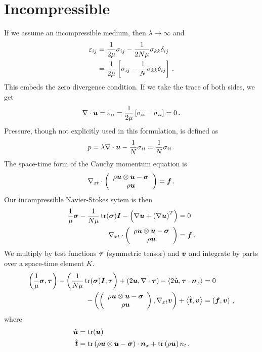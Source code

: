 \documentclass{article}
\begin{document}
\section*{Incompressible}
If we assume an incompressible medium, then $\lambda\rightarrow\infty$ and
\begin{align*}
  \varepsilon_{ij}&=\frac{1}{2\mu}\sigma_{ij}-\frac{1}{2N\mu}\sigma_{kk}\delta_{ij}\\
  &=\frac{1}{2\mu}\left[ \sigma_{ij}-\frac{1}{N}\sigma_{kk}\delta_{ij} \right]\,.
\end{align*}
This embeds the zero divergence condition. If we take the trace of both sides, we get
\begin{align*}
  \nabla\cdot\boldsymbol u=\varepsilon_{ii}=\frac{1}{2\mu}\left[ \sigma_{ii}-\sigma_{ii} \right]=0\,.
\end{align*}
Pressure, though not explicitly used in this formulation, is defined as
\begin{equation*}
p=\lambda\nabla\cdot\boldsymbol u-\frac{1}{N}\sigma_{ii}=\frac{1}{N}\sigma_{ii}\,.
\end{equation*}
The space-time form of the Cauchy momentum equation is
\begin{equation*}
\nabla_{xt}\cdot\left( \begin{array}{c} \rho\boldsymbol u\otimes\boldsymbol u-\boldsymbol\sigma\\ \rho\boldsymbol u\\ \end{array} \right)=\boldsymbol f\,.
\end{equation*}
Our incompressible Navier-Stokes sytem is then
\begin{align*}
\frac{1}{\mu}\boldsymbol\sigma-\frac{1}{N\mu}\operatorname*{tr}(\boldsymbol\sigma)\boldsymbol I-\left( \nabla\boldsymbol u+\left( \nabla\boldsymbol u \right)^T \right)&=0\\
\nabla_{xt}\cdot\left( \begin{array}{c} \rho\boldsymbol u\otimes\boldsymbol u-\boldsymbol\sigma\\ \rho\boldsymbol u\\ \end{array} \right)&=\boldsymbol f\,.
\end{align*}
We multiply by test functions $\boldsymbol\tau$ (symmetric tensor) and $\boldsymbol v$ and integrate by parts over a space-time element $K$.
\begin{align*}
\left( \frac{1}{\mu}\boldsymbol\sigma,\boldsymbol\tau \right)-\left( \frac{1}{N\mu}\operatorname*{tr}(\boldsymbol\sigma)\boldsymbol I,\boldsymbol\tau \right)+\left( 2\boldsymbol u,\nabla\cdot\boldsymbol\tau \right)-\left\langle 2\hat{\boldsymbol u},\boldsymbol\tau\cdot\boldsymbol n_x \right\rangle&=0\\
-\left( \left( \begin{array}{c} \rho\boldsymbol u\otimes\boldsymbol u-\boldsymbol\sigma\\ \rho\boldsymbol u\\ \end{array} \right),\nabla_{xt}\boldsymbol v \right)+\left\langle \hat{\boldsymbol t},\boldsymbol v \right\rangle&=\left( \boldsymbol f,\boldsymbol v \right)\,,
\end{align*}
where 
\begin{equation*}
\begin{aligned}
\hat{\boldsymbol u}&=\operatorname*{tr}(\boldsymbol u)\\
\hat{\boldsymbol t}&=\operatorname*{tr}\left( \rho\boldsymbol u\otimes\boldsymbol u-\boldsymbol\sigma \right)\cdot\boldsymbol n_x
+\operatorname*{tr}\left( \rho\boldsymbol u \right) n_t\,.
\end{aligned}
\end{equation*}
\end{document}
